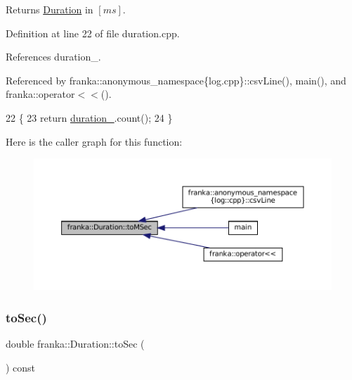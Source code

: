 \begin{DoxyReturn}{Returns}
\hyperlink{classfranka_1_1Duration}{Duration} in $[ms]$. 
\end{DoxyReturn}


Definition at line 22 of file duration.\+cpp.



References duration\+\_\+.



Referenced by franka\+::anonymous\+\_\+namespace\{log.\+cpp\}\+::csv\+Line(), main(), and franka\+::operator$<$$<$().


\begin{DoxyCode}
22                                          \{
23   \textcolor{keywordflow}{return} \hyperlink{classfranka_1_1Duration_ae446c403b200f0dbf92fb51ca21e82ff}{duration\_}.count();
24 \}
\end{DoxyCode}
Here is the caller graph for this function\+:
\nopagebreak
\begin{figure}[H]
\begin{center}
\leavevmode
\includegraphics[width=350pt]{classfranka_1_1Duration_a2a25ae33c8739b8f705f13798aa9e162_icgraph}
\end{center}
\end{figure}
\mbox{\label{classfranka_1_1Duration_a497af77a3280159547f231f0374e9ac1}} 
\subsubsection{\texorpdfstring{to\+Sec()}{toSec()}}
{\footnotesize\ttfamily double franka\+::\+Duration\+::to\+Sec (\begin{DoxyParamCaption}{ }\end{DoxyParamCaption}) const\hspace{0.3cm}{\ttfamily [noexcept]}}

